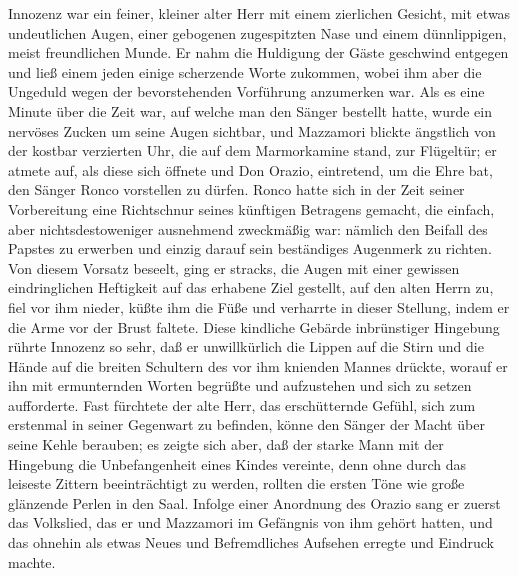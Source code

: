 Innozenz war ein feiner, kleiner alter Herr mit einem zierlichen
Gesicht, mit etwas undeutlichen Augen, einer gebogenen zugespitzten
Nase und einem dünnlippigen, meist freundlichen Munde. Er nahm die
Huldigung der Gäste geschwind entgegen und ließ einem jeden einige
scherzende Worte zukommen, wobei ihm aber die Ungeduld wegen der
bevorstehenden Vorführung anzumerken war. Als es eine
\pagenum{[84]}Minute über die Zeit war, auf welche man den Sänger
bestellt hatte, wurde ein nervöses Zucken um seine Augen sichtbar,
und Mazzamori blickte ängstlich von der kostbar verzierten Uhr, die
auf dem Marmorkamine stand, zur Flügeltür; er atmete auf, als diese
sich öffnete und Don Orazio, eintretend, um die Ehre bat, den
Sänger Ronco vorstellen zu dürfen. Ronco hatte sich in der Zeit
seiner Vorbereitung eine Richtschnur seines künftigen Betragens
gemacht, die einfach, aber nichtsdestoweniger ausnehmend zweckmäßig
war: nämlich den Beifall des Papstes zu erwerben und einzig darauf
sein beständiges Augenmerk zu richten. Von diesem Vorsatz beseelt,
ging er stracks, die Augen mit einer gewissen eindringlichen
Heftigkeit auf das erhabene Ziel gestellt, auf den alten Herrn zu,
fiel vor ihm nieder, küßte ihm die Füße und verharrte in dieser
Stellung, indem er die Arme vor der Brust faltete. Diese kindliche
Gebärde inbrünstiger Hingebung rührte Innozenz so sehr, daß er
unwillkürlich die Lippen auf die Stirn und die Hände auf die
breiten Schultern des vor ihm knienden Mannes drückte, worauf er
ihn mit ermunternden Worten begrüßte und aufzustehen und sich zu
setzen aufforderte. Fast fürchtete der alte Herr, das erschütternde
Gefühl, sich zum erstenmal in seiner Gegenwart zu befinden, könne
den Sänger der Macht über seine Kehle berauben; es zeigte sich
aber, daß der starke Mann mit der Hingebung die Unbefangenheit
eines Kindes vereinte, denn ohne durch das leiseste Zittern
beeinträchtigt zu werden, rollten die ersten Töne wie große
glänzende Perlen in den Saal. Infolge einer Anordnung des Orazio
sang er zuerst das Volkslied, das er und Mazzamori im Gefängnis von
ihm gehört hatten, und das ohnehin als etwas Neues und
Befremdliches Aufsehen erregte und Eindruck machte.

